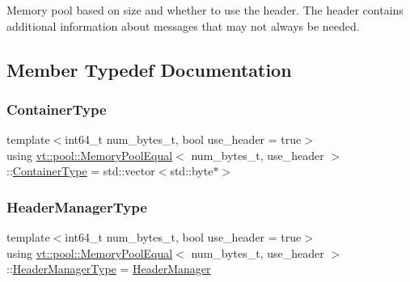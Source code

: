 Memory pool based on size and whether to use the header. The header contains additional information about messages that may not always be needed. 

\subsection{Member Typedef Documentation}
\mbox{\label{structvt_1_1pool_1_1_memory_pool_equal_a3f343f1f8f74e333c8fffad7698c85f1}} 
\subsubsection{\texorpdfstring{Container\+Type}{ContainerType}}
{\footnotesize\ttfamily template$<$int64\+\_\+t num\+\_\+bytes\+\_\+t, bool use\+\_\+header = true$>$ \\
using \hyperlink{structvt_1_1pool_1_1_memory_pool_equal}{vt\+::pool\+::\+Memory\+Pool\+Equal}$<$ num\+\_\+bytes\+\_\+t, use\+\_\+header $>$\+::\hyperlink{structvt_1_1pool_1_1_memory_pool_equal_a3f343f1f8f74e333c8fffad7698c85f1}{Container\+Type} =  std\+::vector$<$std\+::byte$\ast$$>$}

\mbox{\label{structvt_1_1pool_1_1_memory_pool_equal_aede857d1f5e084ce6a25f9a499c74047}} 
\subsubsection{\texorpdfstring{Header\+Manager\+Type}{HeaderManagerType}}
{\footnotesize\ttfamily template$<$int64\+\_\+t num\+\_\+bytes\+\_\+t, bool use\+\_\+header = true$>$ \\
using \hyperlink{structvt_1_1pool_1_1_memory_pool_equal}{vt\+::pool\+::\+Memory\+Pool\+Equal}$<$ num\+\_\+bytes\+\_\+t, use\+\_\+header $>$\+::\hyperlink{structvt_1_1pool_1_1_memory_pool_equal_aede857d1f5e084ce6a25f9a499c74047}{Header\+Manager\+Type} =  \hyperlink{structvt_1_1pool_1_1_header_manager}{Header\+Manager}}

